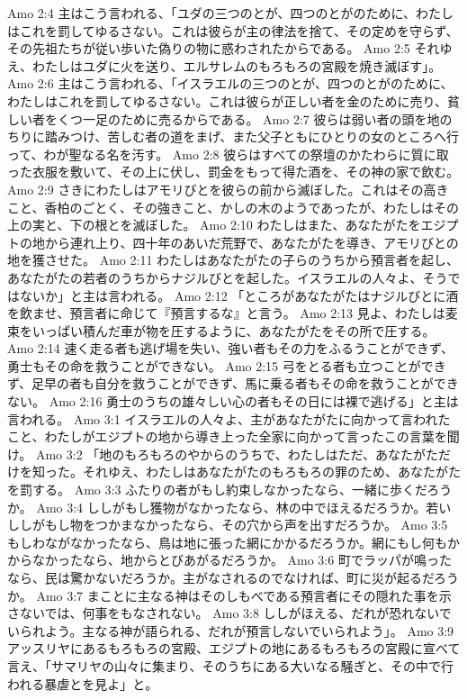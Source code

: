 Amo 2:4  主はこう言われる、「ユダの三つのとが、四つのとがのために、わたしはこれを罰してゆるさない。これは彼らが主の律法を捨て、その定めを守らず、その先祖たちが従い歩いた偽りの物に惑わされたからである。
Amo 2:5  それゆえ、わたしはユダに火を送り、エルサレムのもろもろの宮殿を焼き滅ぼす」。
Amo 2:6  主はこう言われる、「イスラエルの三つのとが、四つのとがのために、わたしはこれを罰してゆるさない。これは彼らが正しい者を金のために売り、貧しい者をくつ一足のために売るからである。
Amo 2:7  彼らは弱い者の頭を地のちりに踏みつけ、苦しむ者の道をまげ、また父子ともにひとりの女のところへ行って、わが聖なる名を汚す。
Amo 2:8  彼らはすべての祭壇のかたわらに質に取った衣服を敷いて、その上に伏し、罰金をもって得た酒を、その神の家で飲む。
Amo 2:9  さきにわたしはアモリびとを彼らの前から滅ぼした。これはその高きこと、香柏のごとく、その強きこと、かしの木のようであったが、わたしはその上の実と、下の根とを滅ぼした。
Amo 2:10  わたしはまた、あなたがたをエジプトの地から連れ上り、四十年のあいだ荒野で、あなたがたを導き、アモリびとの地を獲させた。
Amo 2:11  わたしはあなたがたの子らのうちから預言者を起し、あなたがたの若者のうちからナジルびとを起した。イスラエルの人々よ、そうではないか」と主は言われる。
Amo 2:12  「ところがあなたがたはナジルびとに酒を飲ませ、預言者に命じて『預言するな』と言う。
Amo 2:13  見よ、わたしは麦束をいっぱい積んだ車が物を圧するように、あなたがたをその所で圧する。
Amo 2:14  速く走る者も逃げ場を失い、強い者もその力をふるうことができず、勇士もその命を救うことができない。
Amo 2:15  弓をとる者も立つことができず、足早の者も自分を救うことができず、馬に乗る者もその命を救うことができない。
Amo 2:16  勇士のうちの雄々しい心の者もその日には裸で逃げる」と主は言われる。
Amo 3:1  イスラエルの人々よ、主があなたがたに向かって言われたこと、わたしがエジプトの地から導き上った全家に向かって言ったこの言葉を聞け。
Amo 3:2  「地のもろもろのやからのうちで、わたしはただ、あなたがただけを知った。それゆえ、わたしはあなたがたのもろもろの罪のため、あなたがたを罰する。
Amo 3:3  ふたりの者がもし約束しなかったなら、一緒に歩くだろうか。
Amo 3:4  ししがもし獲物がなかったなら、林の中でほえるだろうか。若いししがもし物をつかまなかったなら、その穴から声を出すだろうか。
Amo 3:5  もしわながなかったなら、鳥は地に張った網にかかるだろうか。網にもし何もかからなかったなら、地からとびあがるだろうか。
Amo 3:6  町でラッパが鳴ったなら、民は驚かないだろうか。主がなされるのでなければ、町に災が起るだろうか。
Amo 3:7  まことに主なる神はそのしもべである預言者にその隠れた事を示さないでは、何事をもなされない。
Amo 3:8  ししがほえる、だれが恐れないでいられよう。主なる神が語られる、だれが預言しないでいられよう」。
Amo 3:9  アッスリヤにあるもろもろの宮殿、エジプトの地にあるもろもろの宮殿に宣べて言え、「サマリヤの山々に集まり、そのうちにある大いなる騒ぎと、その中で行われる暴虐とを見よ」と。
